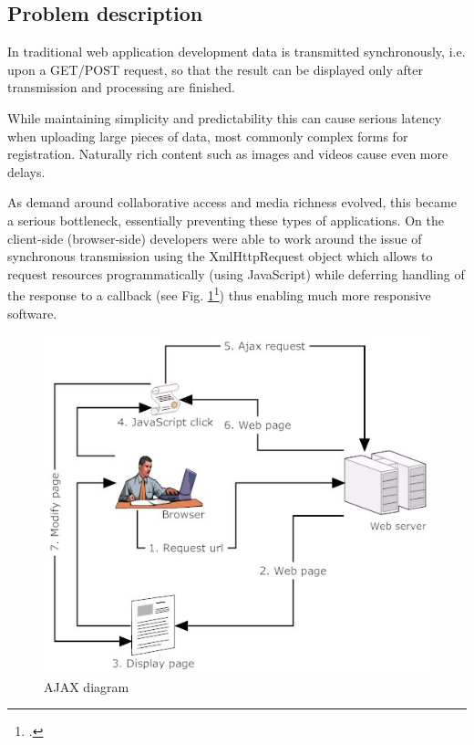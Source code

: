\subsection{Problem description}

In traditional web application development data is transmitted synchronously,
i.e. upon a GET/POST request, so that the result can be displayed only after transmission
and processing are finished.

While maintaining simplicity and
predictability this can cause serious latency when uploading large pieces of
data, most commonly complex forms for registration. Naturally rich content such
as images and videos cause even more delays.

As demand around collaborative access and media richness evolved, this became a
serious bottleneck, essentially preventing these types of applications. On the
client-side (browser-side) developers were able to work around the issue of
synchronous transmission using the XmlHttpRequest object which allows to request
resources programmatically (using JavaScript) while
deferring handling of the response to a callback (see Fig. \ref{img_ajax}\footcite{img_ajax}) thus enabling much more responsive software.

\begin{figure}[hbtp]
\centering
\includegraphics[scale=0.5]{img/ajax-diagram}
\caption[AJAX diagram]{AJAX diagram\label{img_ajax}}
\end{figure}

